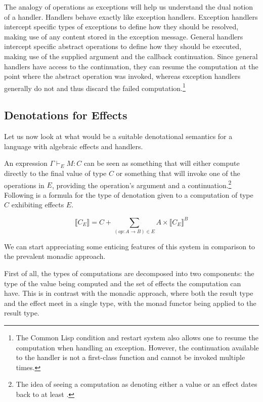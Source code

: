 \documentclass{article}
\newcommand{\sem}[1]{\llbracket #1 \rrbracket}
\begin{document}
The analogy of operations as exceptions will help us understand the dual
notion of a handler. Handlers behave exactly like exception
handlers. Exception handlers intercept specific types of exceptions to define
how they should be resolved, making use of any content stored in the exception
message. General handlers intercept specific abstract operations to define how
they should be executed, making use of the supplied argument and the callback
continuation. Since general handlers have access to the continuation, they can
resume the computation at the point where the abstract operation was invoked,
whereas exception handlers generally do not and thus discard the failed
computation.\footnote{The Common Lisp condition and restart system also allows
  one to resume the computation when handling an exception. However, the
  continuation available to the handler is not a first-class function and
  cannot be invoked multiple times.}

\subsection{Denotations for Effects}
\label{ssec:denotations-for-effects}

Let us now look at what would be a suitable denotational semantics for a
language with algebraic effects and handlers.

An expression $\Gamma \vdash_E M : C$ can be seen as something that will
either compute directly to the final value of type $C$ or something that will
invoke one of the operations in $E$, providing the operation's argument and a
continuation.\footnote{The idea of seeing a computation as denoting either a
  value or an effect dates back to at least \citet{cartwright1994extensible}.}
Following is a formula for the type of denotation given to a computation of type
$C$ exhibiting effects $E$. \citep{bauer2012programming}
\citep{kiselyov2013extensible}

$$
\sem{C_E} = C + \sum_{(op : A \to B) \in E} A \times \sem{C_E}^B
$$

We can start appreciating some enticing features of this system in comparison
to the prevalent monadic approach.

First of all, the types of computations are decomposed into two components:
the type of the value being computed and the set of effects the computation
can have. This is in contrast with the monadic approach, where both the result
type and the effect meet in a single type, with the monad functor being
applied to the result type.
\end{document}
